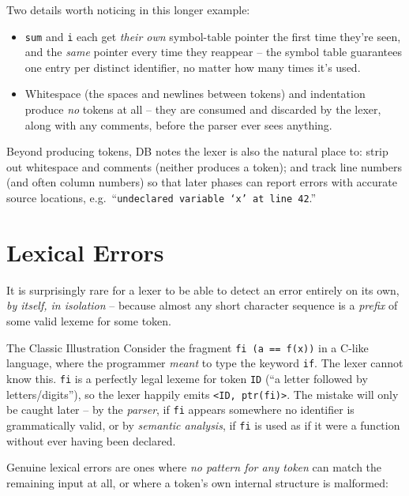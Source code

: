 \documentclass[full-course-notes.tex]{subfiles}
\begin{document}
Two details worth noticing in this longer example:
\begin{itemize}
  \item \texttt{sum} and \texttt{i} each get \emph{their own} symbol-table pointer the first
  time they're seen, and the \emph{same} pointer every time they reappear -- the symbol table
  guarantees one entry per distinct identifier, no matter how many times it's used.
  \item Whitespace (the spaces and newlines between tokens) and indentation produce \emph{no}
  tokens at all -- they are consumed and discarded by the lexer, along with any comments, before
  the parser ever sees anything.
\end{itemize}

\begin{coreidea}
Beyond producing tokens, DB notes the lexer is also the natural place to: strip out whitespace
and comments (neither produces a token); and track line numbers (and often column numbers) so
that later phases can report errors with accurate source locations, e.g.\ ``\texttt{undeclared
variable `x' at line 42}.''
\end{coreidea}

\section{Lexical Errors}
\label{sec:l3-lexical-errors}

\dbtag It is surprisingly rare for a lexer to be able to detect an error entirely on its own,
\emph{by itself, in isolation} -- because almost any short character sequence is a \emph{prefix}
of some valid lexeme for some token.

\begin{examplebox}{The Classic Illustration}
Consider the fragment \texttt{fi (a == f(x))} in a C-like language, where the programmer
\emph{meant} to type the keyword \texttt{if}. The lexer cannot know this. \texttt{fi} is a
perfectly legal lexeme for token \texttt{ID} (``a letter followed by letters/digits''), so the
lexer happily emits \texttt{<ID, ptr(fi)>}. The mistake will only be caught later -- by the
\emph{parser}, if \texttt{fi} appears somewhere no identifier is grammatically valid, or by
\emph{semantic analysis}, if \texttt{fi} is used as if it were a function without ever having
been declared.
\end{examplebox}

Genuine lexical errors are ones where \emph{no pattern for any token} can match the remaining
input at all, or where a token's own internal structure is malformed:
\end{document}
